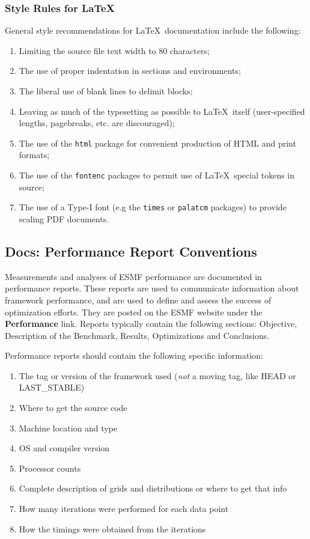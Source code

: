 

\subsubsection{Style Rules for \LaTeX}

General style recommendations for \LaTeX\ documentation include the
following:

\begin{enumerate}
\item Limiting the source file text width to 80 characters;
\item The use of proper indentation in sections and environments;
\item The liberal use of blank lines to delimit blocks;
\item Leaving as much of the typesetting as possible to \LaTeX\ itself
  (user-specified lengths, pagebreaks, etc. are discouraged);
\item The use of the \texttt{html} package for convenient production
  of HTML and print formats;
\item The use of the \texttt{fontenc} packages
  to permit use of \LaTeX\ special tokens in source;
\item The use of a Type-I font (e.g the \texttt{times} or
  \texttt{palatcm} packages) to provide scaling PDF documents.
\end{enumerate}

\subsection{Docs: Performance Report Conventions}
Measurements and analyses of ESMF performance are documented in
performance reports.  These reports are used to communicate 
information about framework performance, and are used to
define and assess the success of optimization efforts.
They are posted on the ESMF website under the {\bf Performance}
link.  Reports typically contain the following sections:  Objective,
Description of the Benchmark,  Results, Optimizations 
and Conclusions.

Performance reports should contain the following specific 
information:
\begin{enumerate}
\item The tag or version of the framework used ({\it not} a moving tag,
like HEAD or LAST\_STABLE)
\item Where to get the source code
\item Machine location and type
\item OS and compiler version
\item Processor counts
\item Complete description of grids and distributions or where
to get that info
\item How many iterations were performed for each data point
\item How the timings were obtained from the iterations 
\end{enumerate}

